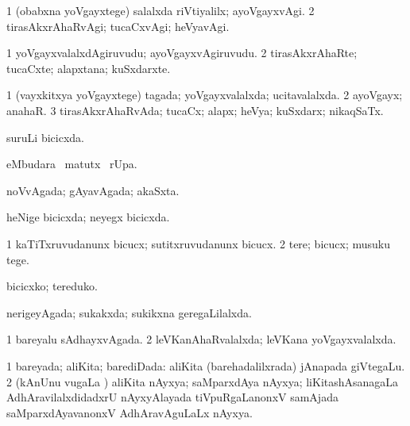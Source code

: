 \bentry
{} 
\gl{\kirxvi}
\expl{}
\bmng
\bnum
\num{1} (obabxna yoVgayxtege) salalxda riVtiyalilx; ayoVgayxvAgi. 
\num{2} tirasAkxrAhaRvAgi; tucaCxvAgi; heVyavAgi. 
\enum
\emng
\eentry

\bentry
{} 
\gl{\nA}
\expl{}
\bmng
\bnum
\num{1} yoVgayxvalalxdAgiruvudu; ayoVgayxvAgiruvudu. 
\num{2} tirasAkxrAhaRte; tucaCxte; alapxtana; kuSxdarxte. 
\enum
\emng
\eentry

\bentry
{} 
\gl{\gu}
\bmng
\bnum
\num{1} (vayxkitxya yoVgayxtege) tagada; yoVgayxvalalxda; ucitavalalxda. 
\num{2} ayoVgayx; anahaR. 
\num{3} tirasAkxrAhaRvAda; tucaCx; alapx; heVya; kuSxdarx; nikaqSaTx. 
\enum
\emng
\eentry

\bentry
{} 
\gl{\gu}
\expl{}
\bmng
suruLi bicicxda. 
\emng
\eentry

\bentry
{} 
\gl{\kirx}
\expl{}
\bmng
{} eMbudara \BU\ matutx \BUkaq\ rUpa. 
\emng
\eentry

\bentry
{} 
\gl{\gu}
\expl{}
\bmng
noVvAgada; gAyavAgada; akaSxta. 
\emng
\eentry

\bentry
{} 
\gl{\gu}
\expl{}
\bmng
heNige bicicxda; neyegx bicicxda. 
\emng
\eentry

\bentry
{} 
\gl{\kirx}


\noindent
\gl{\sakirx}
\expl{}
\bmng
\bnum
\num{1} kaTiTxruvudanunx bicucx; sutitxruvudanunx bicucx. 
\num{2} tere; bicucx; musuku tege. 
\enum
\emng

\noindent
\gl{\akirx}
\expl{}
\bmng
bicicxko; tereduko. 
\emng
\eentry

\bentry
{} 
\gl{\gu}
\expl{}
\bmng
nerigeyAgada; sukakxda; sukikxna geregaLilalxda. 
\emng
\eentry

\bentry
{} 
\gl{\gu}
\expl{}
\bmng
\bnum
\num{1} bareyalu sAdhayxvAgada. 
\num{2} leVKanAhaRvalalxda; leVKana yoVgayxvalalxda. 
\enum
\emng
\eentry

\bentry
{} 
\gl{\gu}
\expl{}
\bmng
\bnum
\num{1} bareyada; aliKita; barediDada:  aliKita (barehadalilxrada) jAnapada giVtegaLu. 
\num{2} (kAnUnu \mo vugaLa \vi) aliKita nAyxya; saMparxdAya nAyxya; liKitashAsanagaLa AdhAravilalxdidadxrU nAyxyAlayada tiVpuRgaLanonxV samAjada saMparxdAyavanonxV AdhAravAguLaLx nAyxya. 
\enum
\emng
\eentry

